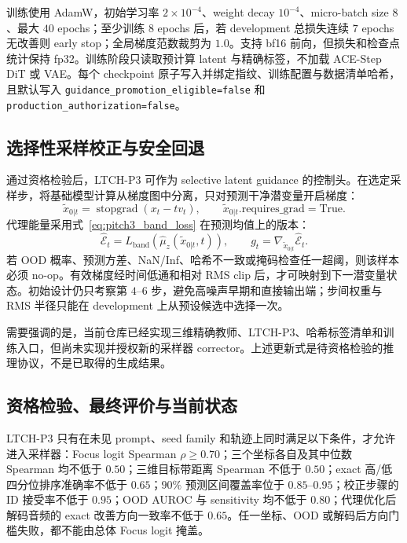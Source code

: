 \documentclass{article}
\begin{document}
训练使用 AdamW，初始学习率 $2\times10^{-4}$、weight decay $10^{-4}$、micro-batch size $8$、最大 $40$ epochs；至少训练 $8$ epochs 后，若 development 总损失连续 $7$ epochs 无改善则 early stop；全局梯度范数裁剪为 $1.0$。支持 bf16 前向，但损失和检查点统计保持 fp32。训练阶段只读取预计算 latent 与精确标签，不加载 ACE-Step DiT 或 VAE。每个 checkpoint 原子写入并绑定指纹、训练配置与数据清单哈希，且默认写入 \texttt{guidance\_promotion\_eligible=false} 和 \texttt{production\_authorization=false}。

\subsection{选择性采样校正与安全回退}

通过资格检验后，LTCH-P3 可作为 selective latent guidance 的控制头。在选定采样步，将基础模型计算从梯度图中分离，只对预测干净潜变量开启梯度：
\begin{equation}
\tilde{x}_{0|t}=\operatorname{stopgrad}(x_t-tv_t),
\qquad \tilde{x}_{0|t}.\mathrm{requires\_grad}=\mathrm{True}.
\end{equation}
代理能量采用式~\eqref{eq:pitch3_band_loss} 在预测均值上的版本：
\begin{equation}
\widehat{\mathcal E}_t=
L_{\mathrm{band}}(\hat\mu_z(\tilde{x}_{0|t},t)),
\qquad
g_t=\nabla_{\tilde{x}_{0|t}}\widehat{\mathcal E}_t.
\label{eq:pitch3_guidance}
\end{equation}
若 OOD 概率、预测方差、NaN/Inf、哈希不一致或掩码检查任一超阈，则该样本必须 no-op。有效梯度经时间低通和相对 RMS clip 后，才可映射到下一潜变量状态。初始设计仍只考察第 $4$--$6$ 步，避免高噪声早期和直接输出端；步间权重与 RMS 半径只能在 development 上从预设候选中选择一次。

需要强调的是，当前仓库已经实现三维精确教师、LTCH-P3、哈希标签清单和训练入口，但尚未实现并授权新的采样器 corrector。上述更新式是待资格检验的推理协议，不是已取得的生成结果。

\subsection{资格检验、最终评价与当前状态}

LTCH-P3 只有在未见 prompt、seed family 和轨迹上同时满足以下条件，才允许进入采样器：Focus logit Spearman $\rho\geq0.70$；三个坐标各自及其中位数 Spearman 均不低于 $0.50$；三维目标带距离 Spearman 不低于 $0.50$；exact 高/低四分位排序准确率不低于 $0.65$；$90\%$ 预测区间覆盖率位于 $0.85$--$0.95$；校正步骤的 ID 接受率不低于 $0.95$；OOD AUROC 与 sensitivity 均不低于 $0.80$；代理优化后解码音频的 exact 改善方向一致率不低于 $0.65$。任一坐标、OOD 或解码后方向门槛失败，都不能由总体 Focus logit 掩盖。
\end{document}
